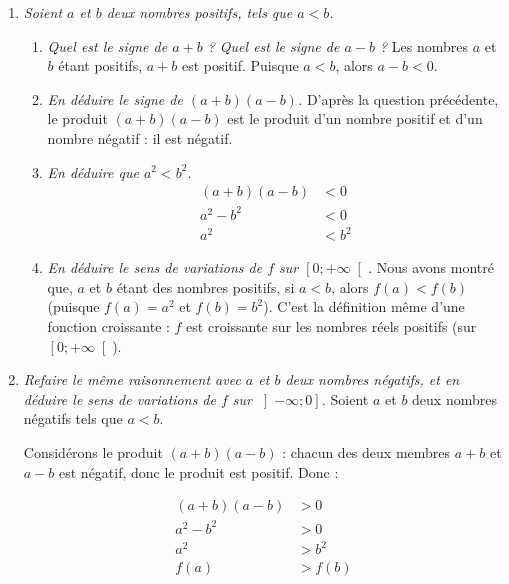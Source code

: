 \documentclass[11pt]{article}
\begin{document}
\begin{exercice}
\begin{enumerate}
\begin{enumerate}
          \label{question:variations-carree}
      \end{enumerate}
    \item \emph{Soient $a$ et $b$ deux nombres positifs, tels que $a<b$.}
      \begin{enumerate}
        \item \emph{Quel est le signe de $a+b$ ? Quel est le signe de $a-b$ ?}
          Les nombres $a$ et $b$ étant positifs, $a+b$ est positif. Puisque $a<b$, alors $a-b<0$.
        \item \emph{En déduire le signe de $\left( a+b \right)\left( a-b \right)$.}
          D'après la question précédente, le produit $\left( a+b \right)\left( a-b \right)$ est le produit d'un nombre positif et d'un nombre négatif : il est négatif.
        \item
            \emph{En déduire que $a^2<b^2$.}
          \begin{align*}
            \left( a+b \right)\left( a-b \right) &< 0 \\
            a^2-b^2 &<0 \\
            a^2 &< b^2
          \end{align*}
        \item \emph{En déduire le sens de variations de $f$ sur $\left[ 0; +\infty \right[$.}
            Nous avons montré que, $a$ et $b$ étant des nombres positifs, si $a<b$, alors $f(a)<f(b)$ (puisque $f(a)=a^2$ et $f(b)=b^2$). C'est la définition même d'une fonction croissante : $f$ est croissante sur les nombres réels positifs (sur $\left[ 0; +\infty \right[$).
        \end{enumerate}
    \item \emph{Refaire le même raisonnement avec $a$ et $b$ deux nombres négatifs, et en déduire le sens de variations de $f$ sur $\left] -\infty;0 \right]$.}
      Soient $a$ et $b$ deux nombres négatifs tels que $a<b$.

      Considérons le produit $\left( a+b \right)\left( a-b \right)$ : chacun des deux membres $a+b$ et $a-b$ est négatif, donc le produit est positif. Donc :
      \begin{multicols}{2}
      \begin{align*}
        \left( a+b \right)\left( a-b \right) &>0 \\
        a^2-b^2 &> 0 \\
        a^2 &> b^2 \\
        f(a) &> f(b)
      \end{align*}


\end{multicols}
\end{enumerate}
\end{exercice}
\end{document}
